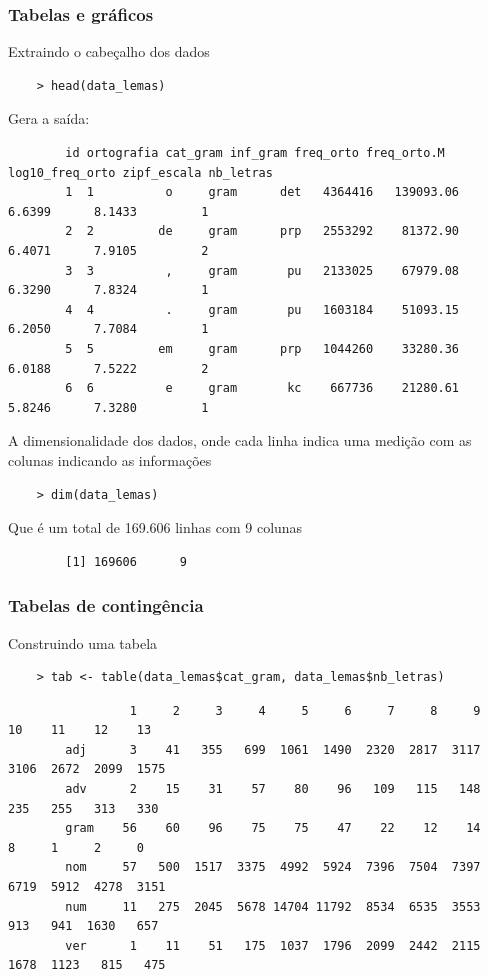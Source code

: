 \documentclass[graphics,14pt]{beamer}
\begin{document}
\begin{frame}[t,fragile=singleslide]
\frametitle{Tabelas e gráficos}
	Extraindo o cabeçalho dos dados
	\begin{lstlisting}
	> head(data_lemas)
	\end{lstlisting}
	Gera a saída:
	\begin{addmargin}[2.45cm]{0em}
		\normalsize 
		\begin{verbatim}
		id ortografia cat_gram inf_gram freq_orto freq_orto.M log10_freq_orto zipf_escala nb_letras
		1  1          o     gram      det   4364416   139093.06          6.6399      8.1433         1
		2  2         de     gram      prp   2553292    81372.90          6.4071      7.9105         2
		3  3          ,     gram       pu   2133025    67979.08          6.3290      7.8324         1
		4  4          .     gram       pu   1603184    51093.15          6.2050      7.7084         1
		5  5         em     gram      prp   1044260    33280.36          6.0188      7.5222         2
		6  6          e     gram       kc    667736    21280.61          5.8246      7.3280         1
		\end{verbatim}
	\end{addmargin}
	A dimensionalidade dos dados, onde cada linha indica uma medição com as colunas indicando as informações\\
	\begin{lstlisting}
	> dim(data_lemas)
	\end{lstlisting}
	Que é um total de 169.606 linhas com 9 colunas
	\begin{addmargin}[2cm]{0em}
	\normalsize 
	\begin{verbatim}
		[1] 169606      9
	\end{verbatim}
	\end{addmargin}

\end{frame}
\begin{frame}[t,fragile=singleslide]
	\frametitle{Tabelas de contingência}
	Construindo uma tabela
	\begin{lstlisting}
	> tab <- table(data_lemas$cat_gram, data_lemas$nb_letras)
	\end{lstlisting}
	\vspace{2.0cm}

	\begin{addmargin}[2cm]{0em}
		\normalsize 
		\begin{verbatim}
		         1     2     3     4     5     6     7     8     9    10    11    12    13
		adj      3    41   355   699  1061  1490  2320  2817  3117  3106  2672  2099  1575
		adv      2    15    31    57    80    96   109   115   148   235   255   313   330
		gram    56    60    96    75    75    47    22    12    14     8     1     2     0
		nom     57   500  1517  3375  4992  5924  7396  7504  7397  6719  5912  4278  3151
		num     11   275  2045  5678 14704 11792  8534  6535  3553   913   941  1630   657
		ver      1    11    51   175  1037  1796  2099  2442  2115  1678  1123   815   475
		\end{verbatim}
	\end{addmargin}
	
\end{frame}
\end{document}
